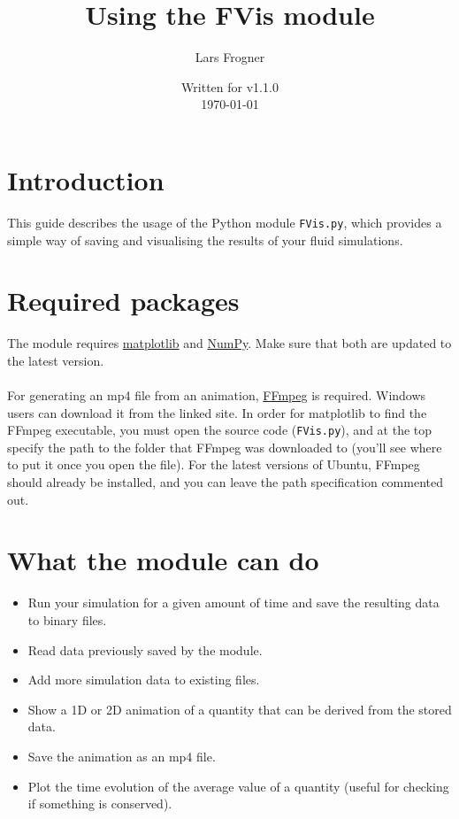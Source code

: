 \documentclass{article}
\newcommand{\ttt}[1]{\texttt{#1}}
\begin{document}
\title{\bfseries Using the FVis module}
\author{Lars Frogner}
\date{Written for v1.1.0\\\today}

\maketitle
\tableofcontents
\newpage
{}

\section{Introduction}
\label{sec:intr}
This guide describes the usage of the Python module \ttt{FVis.py}, which provides a simple way of saving and visualising the results of your fluid simulations.

\section{Required packages}
\label{sec:pack}
The module requires \href{http://matplotlib.org/}{matplotlib} and \href{http://www.numpy.org/}{NumPy}. Make sure that both are updated to the latest version.\\\\
For generating an mp4 file from an animation, \href{https://ffmpeg.org/}{FFmpeg} is required. Windows users can download it from the linked site. In order for matplotlib to find the FFmpeg executable, you must open the source code (\ttt{FVis.py}), and at the top specify the path to the folder that FFmpeg was downloaded to (you'll see where to put it once you open the file). For the latest versions of Ubuntu, FFmpeg should already be installed, and you can leave the path specification commented out.

\section{What the module can do}
\label{sec:cando}
\begin{itemize}
	\item Run your simulation for a given amount of time and save the resulting data to binary files.
	\item Read data previously saved by the module.
	\item Add more simulation data to existing files.
	\item Show a 1D or 2D animation of a quantity that can be derived from the stored data.
	\item Save the animation as an mp4 file.
	\item Plot the time evolution of the average value of a quantity (useful for checking if something is conserved).
\end{itemize}
\end{document}
